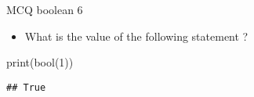 \documentclass[
  8pt,
  ignorenonframetext,
]{beamer}
\newenvironment{Shaded}{\begin{snugshade}}{\end{snugshade}}
\newcommand{\BuiltInTok}[1]{#1}
\newcommand{\DecValTok}[1]{\textcolor[rgb]{0.00,0.00,0.81}{#1}}
\newcommand{\NormalTok}[1]{#1}
\providecommand{\tightlist}{%
  \setlength{\itemsep}{0pt}\setlength{\parskip}{0pt}}
\begin{document}
\begin{frame}[fragile]{MCQ boolean 6}
\protect\hypertarget{mcq-boolean-6-1}{}
\begin{itemize}
\tightlist
\item
  What is the value of the following statement ?
\end{itemize}

\begin{Shaded}
\begin{Highlighting}[]
\BuiltInTok{print}\NormalTok{(}\BuiltInTok{bool}\NormalTok{(}\DecValTok{1}\NormalTok{))}
\end{Highlighting}
\end{Shaded}

\begin{verbatim}
## True
\end{verbatim}
\end{frame}
\end{document}
